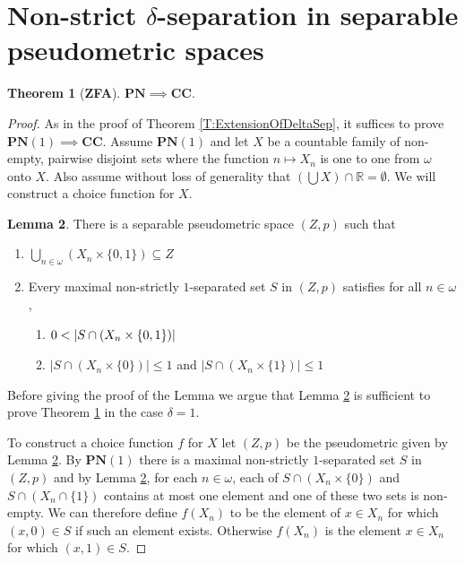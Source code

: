 \documentclass[11pt, reqno]{amsart}
\theoremstyle{definition}
\newtheorem{theorem}{Theorem}
\numberwithin{theorem}{section}
\theoremstyle{definition}
\theoremstyle{definition}
\newtheorem{lemma}[theorem]{Lemma}
\theoremstyle{definition}
\theoremstyle{definition}
\theoremstyle{definition}
\numberwithin{claim}{section}
\theoremstyle{definition}
\theoremstyle{definition}
\theoremstyle{definition}
\theoremstyle{definition}
\theoremstyle{definition}
\theoremstyle{remboldstyle}
\begin{document}
\section{Non-strict $\delta$-separation in separable pseudometric spaces} \label{S:PN}
\begin{theorem}[\textbf{ZFA}]
\label{T:NonStDelSepToCC}
$\mathbf{PN} \implies  \mathbf{CC}$.
\end{theorem}
\begin{proof}
As in the proof of Theorem \ref{T:ExtensionOfDeltaSep}, it suffices to prove $\mathbf{PN}(1) \implies \mathbf{CC}$.
Assume $\textbf{PN}(1)$ and let $X$ be a countable family of non-empty, pairwise disjoint sets where the function $n \mapsto X_n$ is one to one from $\omega$ onto $X$.  Also assume without loss of generality that $(\bigcup X) \cap \mathbb{R} = \emptyset$.  We will construct a choice function for $X$.
 \begin{lemma}
\label{L:delta=1}
There is a separable pseudometric space $(Z,p)$ such that
\begin{enumerate}[topsep=0pt]
\item \label{LC:subset} $\bigcup_{n \in \omega} (X_n \times \{ 0, 1 \}) \subseteq  Z$
\item \label{LC:cardnalities} Every maximal non-strictly $1$-separated set $S$ in $(Z,p)$ satisfies for all $n \in \omega$,
  \begin{enumerate}
  \item
   \label{LC:gt0}  
   $0 < \large| S \cap \large(X_n \times \{ 0, 1\}\large) \large| $
  \item 
   \label{LC:le1}  
  $\left|  S \cap (X_n \times \{ 0 \}) \right| \le 1$ and $\left|  S \cap (X_n \times \{ 1 \}) \right| \le 1$
  \end{enumerate}
\end{enumerate}
\end{lemma}
\par
Before giving the proof of the Lemma we argue that Lemma \ref{L:delta=1} is sufficient to prove Theorem \ref{T:NonStDelSepToCC} in the case $\delta = 1$.  
\par 
To construct a choice function $f$ for $X$ let $(Z,p)$ be the pseudometric given by Lemma \ref{L:delta=1}.  By $\textbf{PN}(1)$ there is a maximal non-strictly $1$-separated set $S$ in $(Z,p)$ and by Lemma \ref{L:delta=1}, for each $n \in \omega$, each of $S \cap (X_n \times \{ 0 \})$ and $S \cap (X_n \cap \{ 1 \})$ contains at most one element and  one of these two sets is non-empty.  We can therefore define $f(X_n)$ to be the element of $x \in X_n$ for which $(x,0) \in S$ if such an element exists.  Otherwise $f(X_n)$ is the element $x \in X_n$ for which $(x,1) \in S$.

\end{proof}
\end{document}
